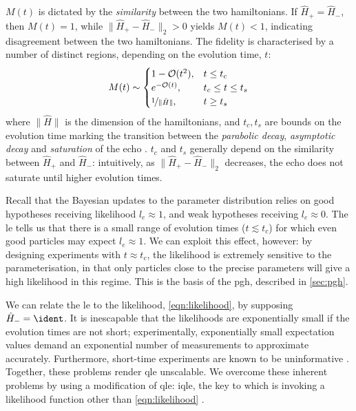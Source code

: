 $M(t)$ is dictated by the \emph{similarity} between the two \glspl{hamiltonian}.
If $\hat{H}_{+} = \hat{H}_{-}$, then $M(t) = 1$, while $\|\hat{H}_{+} - \hat{H}_{-} \|_2 > 0$ yields $M(t) < 1$, 
indicating disagreement between the two \glspl{hamiltonian}. 
The fidelity is characterised by a number of distinct regions, depending on the evolution time, $t$:
\begin{align}
\label{eqn:loschmidt_ranges}
M(t) \sim 
\begin{cases}
    1 - \mathcal{O}(t^2),  & t \leq t_c \\
    e^{-\mathcal{O}(t)}, & t_c \leq t \leq t_{s} \\
    \nicefrac{1}{\| \hat{H} \|}, & t \geq t_{s}
\end{cases}
\end{align}
where $\|\hat{H}\|$ is the dimension of the \glspl{hamiltonian}, and $t_c, t_{s}$ are bounds on the evolution time marking the transition between the 
\emph{parabolic decay}, \emph{asymptotic decay} and \emph{saturation} of the echo \cite{goussev2012loschmidt}. 
$t_c$ and $t_s$ generally depend on the similarity between $\hat{H}_+$ and $\hat{H}_{-}$: 
intuitively, as $\|\hat{H}_+ - \hat{H}_{-}\|_2$ decreases, the echo does not saturate until higher evolution times. 
\par 

Recall that the Bayesian updates to the parameter distribution relies on good hypotheses receiving likelihood $l_e \approx 1$,
and weak hypotheses receiving $l_e \approx 0$. 
The \gls{le} tells us that there is a small range of evolution times ($t \lesssim t_c$) for which even good \glspl{particle} may expect $l_e \approx 1$.
We can exploit this effect, however: 
by designing \glspl{experiment} with $t \approx t_c$, the likelihood is extremely sensitive to the parameterisation, 
in that only \glspl{particle} close to the precise parameters will give a high likelihood in this regime. 
This is the basis of the \acrlong{pgh}, described in \cref{sec:pgh}. 
\par 

We can relate the \gls{le} to the likelihood, \cref{eqn:likelihood}, by supposing $\hat{H}_{-} = \ident$. 
It is inescapable that the \glspl{likelihood} are exponentially small if the evolution times are not short;
experimentally, exponentially small \glspl{expectation value} demand an exponential number of measurements to approximate accurately.
Furthermore, short-time \glspl{experiment} are known to be uninformative \cite{wiebe2014qhlpra, wiebe2015quantum}.
Together, these problems render \gls{qle} unscalable.
We overcome these inherent problems by using a modification of \gls{qle}: \gls{iqle},
the key to which is invoking a \gls{likelihood} function other than \cref{eqn:likelihood} \cite{Wiebe:2014qhl}.

